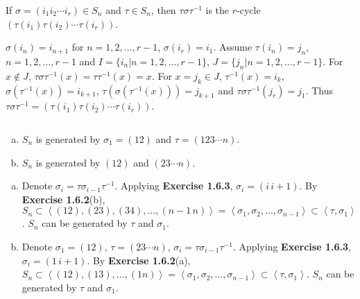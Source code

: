 $$ $$

\begin{ex}
    If $\sigma=(i_{1}i_{2}\cdots i_{r})\in S_{n}$ and $\tau\in S_{n}$, then $\tau\sigma\tau^{-1}$ is the $r$-cycle $(\tau(i_{1})\tau(i_{2})\cdots\tau(i_{r}))$.
\end{ex}

\begin{answer}
    $\sigma(i_{n})=i_{n+1}$ for $n=1,2,\dots,r-1$, $\sigma(i_{r})=i_{1}$. Assume $\tau(i_{n})=j_{n}$, $n=1,2,\dots,r-1$ and $I=\{i_{n}|n=1,2,\dots,r-1\}$, $J=\{j_{n}|n=1,2,\dots,r-1\}$. For $x\notin J$, $\tau\sigma\tau^{-1}(x)=\tau\tau^{-1}(x)=x$. For $x=j_{k}\in J$, $\tau^{-1}(x)=i_{k}$, $\sigma(\tau^{-1}(x))=i_{k+1}$, $\tau(\sigma(\tau^{-1}(x)))=j_{k+1}$ and $\tau\sigma\tau^{-1}(j_{r})=j_{1}$. Thus $\tau\sigma\tau^{-1}=(\tau(i_{1})\tau(i_{2})\cdots\tau(i_{r}))$.
\end{answer}

$$ $$

\begin{ex}
    \begin{enumerate}[(a)]
    \item $S_{n}$  is generated by $\sigma_{1}=(12)$ and $\tau=(123\cdots n)$.
    \item $S_{n}$ is generated by $(12)$ and $(23\cdots n)$.
    \end{enumerate}
\end{ex}

\begin{answer}
    \begin{enumerate}[(a)]
        \item Denote $\sigma_{i}=\tau\sigma_{i-1}\tau^{-1}$. Applying \textbf{Exercise 1.6.3}, $\sigma_{i}=(i\, i+1)$. By \textbf{Exercise 1.6.2}(b), $S_{n}\subset\left\langle (12), (23), (34),\dots, (n-1\, n)\right\rangle=\left\langle\sigma_{1}, \sigma_{2},\dots,\sigma_{n-1}\right\rangle\subset \left\langle \tau, \sigma_{1}\right\rangle$. $S_{n}$ can be generated by $\tau$ and $\sigma_{1}$.
        \item Denote $\sigma_{1}=(12)$, $\tau=(23\cdots n)$, $\sigma_{i}=\tau\sigma_{i-1}\tau^{-1}$. Applying \textbf{Exercise 1.6.3},$\sigma_{i}=(1\, i+1)$. By \textbf{Exercise 1.6.2}(a), $S_{n}\subset\left\langle(12), (13),\dots,(1n)\right\rangle=\left\langle \sigma_{1},\sigma_{2},\dots,\sigma_{n-1}\right\rangle\subset\left\langle \tau,\sigma_{1}\right\rangle$. $S_{n}$ can be generated by $\tau$ and $\sigma_{1}$.
    \end{enumerate}
\end{answer}

